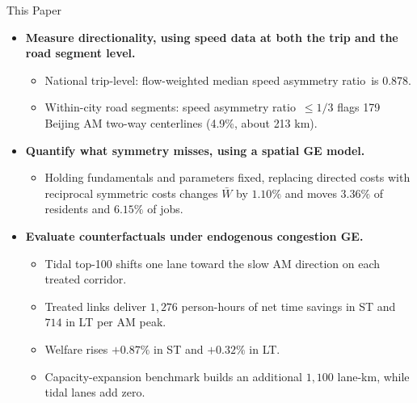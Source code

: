 \documentclass[11pt,aspectratio=169]{beamer}
\newcommand{\good}[1]{\textcolor{blue!70!black}{#1}}
\newcommand{\SAR}{speed asymmetry ratio}
\begin{document}
\begin{frame}{This Paper}
\small
\begin{itemize}
  \item \textbf{Measure directionality, using speed data at both the trip and the road segment level.}
  \begin{itemize}\footnotesize
    \item National trip-level: flow-weighted median \SAR\ is \good{0.878}.
    \item Within-city road segments: \SAR\ $\leq1/3$ flags \good{179} Beijing AM two-way centerlines (\good{4.9\%}, about \good{213 km}).
  \end{itemize}
  \item \textbf{Quantify what symmetry misses, using a spatial GE model.}
  \begin{itemize}\footnotesize
    \item Holding fundamentals and parameters fixed, replacing directed costs with reciprocal symmetric costs changes $\bar W$ by \good{$1.10\%$} and moves \good{$3.36\%$} of residents and \good{$6.15\%$} of jobs.
  \end{itemize}
  \item \textbf{Evaluate counterfactuals under endogenous congestion GE.}
  \begin{itemize}\footnotesize
    \item Tidal top-100 shifts one lane toward the slow AM direction on each treated corridor.
    \item Treated links deliver \good{$1{,}276$ person-hours} of net time savings in ST and \good{$714$} in LT per AM peak.
    \item Welfare rises \good{$+0.87\%$} in ST and \good{$+0.32\%$} in LT.
    \item Capacity-expansion benchmark builds an additional \good{$1{,}100$ lane-km}, while tidal lanes add \good{zero}.
  \end{itemize}
\end{itemize}
\end{frame}
\end{document}
